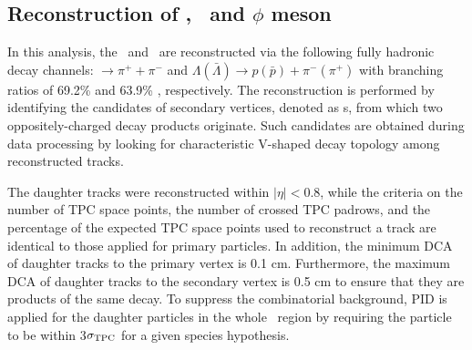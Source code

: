 \subsection{Reconstruction of \Ks, \lambdas~and $\phi$ meson}
\label{SubSec:K0sLambdaPhiRec}



In this analysis, the \Ks~and \lambdas~are reconstructed via the following fully hadronic decay channels: \Ks $\rightarrow \pi^{+} + \pi^{-}$ and  $\Lambda(\bar{\Lambda})\rightarrow p(\bar{p})+\pi^{-}(\pi^{+})$ with branching ratios of 69.2\% and 63.9\% \cite{Olive_2016}, respectively. The reconstruction is performed by identifying the candidates of secondary vertices, denoted as \vo s, from which two oppositely-charged decay products originate. Such candidates are obtained during data processing by looking for characteristic V-shaped decay topology among reconstructed tracks.

The daughter tracks were reconstructed within $|\eta|<0.8$, while the criteria on the number of TPC space points, the number of crossed TPC padrows, and the percentage of the expected TPC space points used to reconstruct a track are identical to those applied for primary particles. In addition, the minimum DCA of daughter tracks to the primary vertex is 0.1 cm. Furthermore, the maximum DCA of daughter tracks to the secondary vertex is 0.5 cm to ensure that they are products of the same decay. To suppress the combinatorial background, PID is applied for the daughter particles in the whole \pT~region by requiring the particle to be within 3$\sigma_{\rm TPC}$ for a given species hypothesis.

